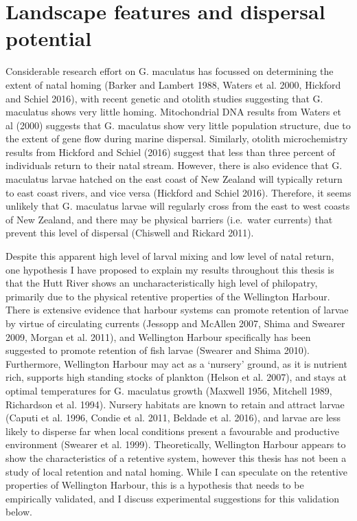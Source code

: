 \documentclass[]{book}
\begin{document}
\section{Landscape features and dispersal
potential}\label{landscape-features-and-dispersal-potential}

Considerable research effort on G. maculatus has focussed on determining
the extent of natal homing (Barker and Lambert 1988, Waters et al. 2000,
Hickford and Schiel 2016), with recent genetic and otolith studies
suggesting that G. maculatus shows very little homing. Mitochondrial DNA
results from Waters et al (2000) suggests that G. maculatus show very
little population structure, due to the extent of gene flow during
marine dispersal. Similarly, otolith microchemistry results from
Hickford and Schiel (2016) suggest that less than three percent of
individuals return to their natal stream. However, there is also
evidence that G. maculatus larvae hatched on the east coast of New
Zealand will typically return to east coast rivers, and vice versa
(Hickford and Schiel 2016). Therefore, it seems unlikely that G.
maculatus larvae will regularly cross from the east to west coasts of
New Zealand, and there may be physical barriers (i.e.~water currents)
that prevent this level of dispersal (Chiswell and Rickard 2011).

Despite this apparent high level of larval mixing and low level of natal
return, one hypothesis I have proposed to explain my results throughout
this thesis is that the Hutt River shows an uncharacteristically high
level of philopatry, primarily due to the physical retentive properties
of the Wellington Harbour. There is extensive evidence that harbour
systems can promote retention of larvae by virtue of circulating
currents (Jessopp and McAllen 2007, Shima and Swearer 2009, Morgan et
al. 2011), and Wellington Harbour specifically has been suggested to
promote retention of fish larvae (Swearer and Shima 2010). Furthermore,
Wellington Harbour may act as a `nursery' ground, as it is nutrient
rich, supports high standing stocks of plankton (Helson et al. 2007),
and stays at optimal temperatures for G. maculatus growth (Maxwell 1956,
Mitchell 1989, Richardson et al. 1994). Nursery habitats are known to
retain and attract larvae (Caputi et al. 1996, Condie et al. 2011,
Beldade et al. 2016), and larvae are less likely to disperse far when
local conditions present a favourable and productive environment
(Swearer et al. 1999). Theoretically, Wellington Harbour appears to show
the characteristics of a retentive system, however this thesis has not
been a study of local retention and natal homing. While I can speculate
on the retentive properties of Wellington Harbour, this is a hypothesis
that needs to be empirically validated, and I discuss experimental
suggestions for this validation below.
\end{document}

